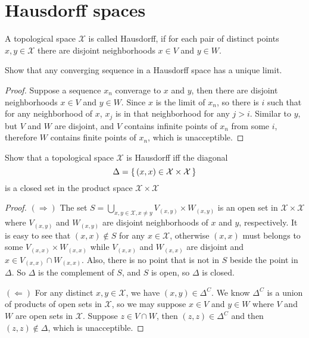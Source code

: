 \documentclass[./main.tex]{subfiles}
\begin{document}
\section{Hausdorff spaces}

\begin{definition}
  A topological space $\mathcal{X}$ is called Hausdorff,
  if for each pair of distinct points $x, y \in \mathcal{X}$
  there are disjoint neighborhoods $x \in V$ and $y \in W$.
\end{definition}

\begin{theorem}
  Show that any converging sequence in a Hausdorff space has a unique limit.
\end{theorem}
\begin{proof}
  Suppose a sequence $x_n$ converage to $x$ and $y$,
  then there are disjoint neighborhoods $x \in V$ and $y \in W$.
  Since $x$ is the limit of $x_n$, so there is $i$ such that for any neighborhood
  of $x$, $x_j$ is in that neighborhood for any $j > i$.
  Similar to $y$, but $V$ and $W$ are disjoint, and $V$ contains infinite points
  of $x_n$ from some $i$, therefore $W$ contains finite points of $x_n$,
  which is unacceptible.
\end{proof}

\begin{theorem}
  Show that a topological space $\mathcal{X}$ is Hausdorff
  iff the diagonal
  \[
  \Delta = \set{(x, x) \in \mathcal{X} \times \mathcal{X}}
  \]
  is a closed set in the product space $\mathcal{X} \times \mathcal{X}$
\end{theorem}
\begin{proof}

  $(\Rightarrow)$ The set $S = \bigcup_{x, y \in \mathcal{X}, x \neq y} V_{(x, y)} \times W_{(x, y)}$
  is an open set in $\mathcal{X} \times \mathcal{X}$ where $V_{(x, y)}$ and $W_{(x, y)}$
  are disjoint neighborhoods of $x$ and $y$, respectively. It is easy to see that
  $(x, x) \notin S$ for any $x \in \mathcal{X}$, otherwise $(x, x)$ must belongs to
  some $V_{(x, x)} \times W_{(x, x)}$ while $V_{(x, x)}$ and $W_{(x, x)}$ are disjoint
  and $x \in V_{(x, x)} \cap W_{(x, x)}$. Also, there is no point that is not in $S$
  beside the point in $\Delta$. So $\Delta$ is the complement of $S$,
  and $S$ is open, so $\Delta$ is closed.
  
  $(\Leftarrow)$ For any distinct $x, y \in \mathcal{X}$, we have $(x, y) \in \Delta^C$.
  We know $\Delta^C$ is a union of products of open sets in $\mathcal{X}$,
  so we may suppose $x \in V$ and $y \in W$ where $V$ and $W$ are open sets in $\mathcal{X}$.
  Suppose $z \in V \cap W$, then $(z, z) \in \Delta^C$ and then $(z, z) \notin \Delta$,
  which is unacceptible.
\end{proof}
\end{document}
